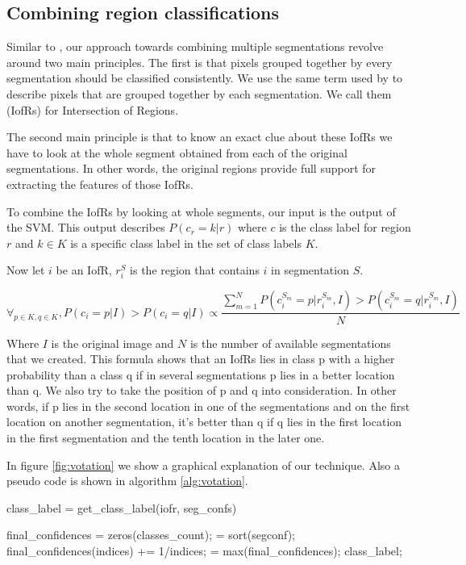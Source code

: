 \documentclass[twoside,11pt]{article}
\begin{document}
\subsection{Combining region classifications}

Similar to \cite{PSH08}, our approach towards combining multiple segmentations
revolve around
two main principles. The first is that pixels grouped together by every
segmentation should be
classified consistently. We use the same term used by \cite{PSH08} to describe
pixels that are
grouped together by each segmentation. We call them (IofRs) for Intersection of
Regions.

The second main principle is that to know an exact clue about these IofRs we
have to look at the whole segment obtained from each of the original segmentations.
In other words, the original  regions provide full support for extracting the
features of those IofRs.

To combine the IofRs by looking at whole segments, our input is the output of the SVM.
This output describes $P(c_r=k|r)$ where $c$ is the class label for region $r$
and $k\in{K}$ is a specific class label in the set of class labels $K$.

Now let $i$ be an IofR, $r_i^S$ is the region that contains $i$ in segmentation
$S$.

\[
\forall_{p\in{K}, q\in{K}}, P(c_i=p|I) > P(c_i=q|I) \propto
\frac{\sum_{m=1}^NP(c_i^{S_m} = p|r_i^{S_m},I) > P(c_i^{S_m} =
q|r_i^{S_m},I)}{N}
\]

Where $I$ is the original image and $N$ is the number of available segmentations
that we created.
This formula shows that an IofRs lies in class p with a higher probability than
a class q if in
several segmentations p lies in a better location than q. We also try to take
the position of p
and q into consideration. In other words, if p lies in the second location in
one of the segmentations
and on the first location on another segmentation, it's better than q if q lies
in the first location
in the first segmentation and the tenth location in the later one.

In figure \ref{fig:votation} we show a graphical explanation of our technique.
Also a pseudo code is
shown in algorithm \ref{alg:votation}.
\begin{algorithm}
\caption{class\_label = get\_class\_label(iofr, seg\_confs)}
\label{alg:votation}
\begin{algorithmic}
\STATE final\_confidences = zeros(classes\_count);
 = sort(segconf);
\STATE final\_confidences(indices) += 1/indices;
\ENDFOR
{} = max(final\_confidences);
\RETURN class\_label;
\end{algorithmic}
\end{algorithm}
\end{document}
